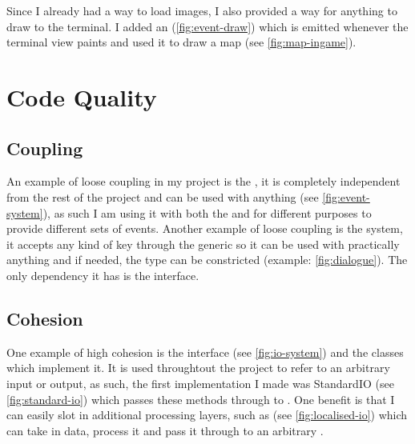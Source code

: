 \documentclass{article}
\begin{document}
\begin{multicols}{2}
                        Since I already had a way to load images, I also provided a way for anything to draw to the terminal. I added an  (\autoref{fig:event-draw}) which is emitted whenever the terminal view paints and used it to draw a map (see \autoref{fig:map-ingame}).

        \section{Code Quality}

            \subsection{Coupling}
                An example of loose coupling in my project is the , it is completely independent from the rest of the project and can be used with anything (see \autoref{fig:event-system}), as such I am using it with both the  and  for different purposes to provide different sets of events. Another example of loose coupling is the  system, it accepts any kind of key through the generic  so it can be used with practically anything and if needed, the type can be constricted (example: \autoref{fig:dialogue}). The only dependency it has is the  interface.

            \subsection{Cohesion}
                One example of high cohesion is the  interface (see \autoref{fig:io-system}) and the classes which implement it. It is used throughtout the project to refer to an arbitrary input or output, as such, the first implementation I made was StandardIO (see \autoref{fig:standard-io}) which passes these methods through to . One benefit is that I can easily slot in additional processing layers, such as  (see \autoref{fig:localised-io}) which can take in data, process it and pass it through to an arbitrary .


\end{multicols}
\end{document}
